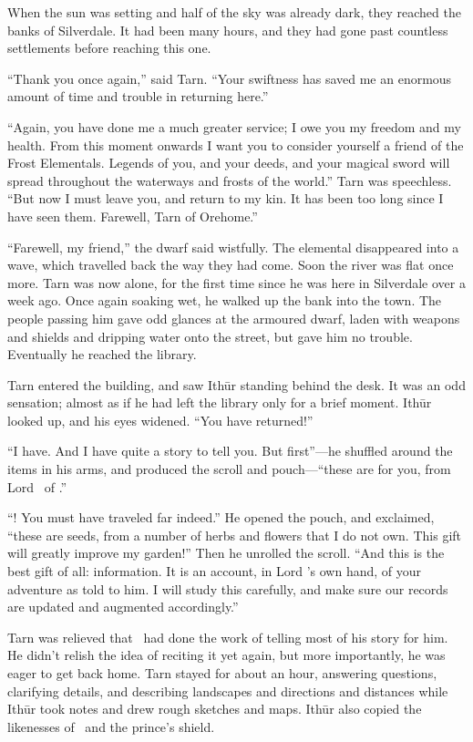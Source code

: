 When the sun was setting and half of the sky was already dark, they reached the banks of Silverdale.  It had been many hours, and they had gone past countless settlements before reaching this one.

``Thank you once again,'' said Tarn.  ``Your swiftness has saved me an enormous amount of time and trouble in returning here.''

``Again, you have done me a much greater service; I owe you my freedom and my health.  From this moment onwards I want you to consider yourself a friend of the Frost Elementals.  Legends of you, and your deeds, and your magical sword will spread throughout the waterways and frosts of the world.''  Tarn was speechless.  ``But now I must leave you, and return to my kin.  It has been too long since I have seen them.  Farewell, Tarn of Orehome.''

``Farewell, my friend,'' the dwarf said wistfully.  The elemental disappeared into a wave, which travelled back the way they had come.  Soon the river was flat once more.  Tarn was now alone, for the first time since he was here in Silverdale over a week ago.  Once again soaking wet, he walked up the bank into the town.  The people passing him gave odd glances at the armoured dwarf, laden with weapons and shields and dripping water onto the street, but gave him no trouble.  Eventually he reached the library.

Tarn entered the building, and saw Ith\=ur standing behind the desk.  It was an odd sensation; almost as if he had left the library only for a brief moment.  Ith\=ur looked up, and his eyes widened.  ``You have returned!''

``I have.  And I have quite a story to tell you.  But first''---he shuffled around the items in his arms, and produced the scroll and pouch---``these are for you, from Lord \arilor\ of \inarthonor.''

``\inarthonor!  You must have traveled far indeed.''  He opened the pouch, and exclaimed, ``these are seeds, from a number of herbs and flowers that I do not own.  This gift will greatly improve my garden!''  Then he unrolled the scroll.  ``And this is the best gift of all: information.  It is an account, in Lord \arilor's own hand, of your adventure as told to him.  I will study this carefully, and make sure our records are updated and augmented accordingly.''

Tarn was relieved that \arilor\ had done the work of telling most of his story for him.  He didn't relish the idea of reciting it yet again, but more importantly, he was eager to get back home.  Tarn stayed for about an hour, answering questions, clarifying details, and describing landscapes and directions and distances while Ith\=ur took notes and drew rough sketches and maps.  Ith\=ur also copied the likenesses of \kildir\ and the prince's shield.

